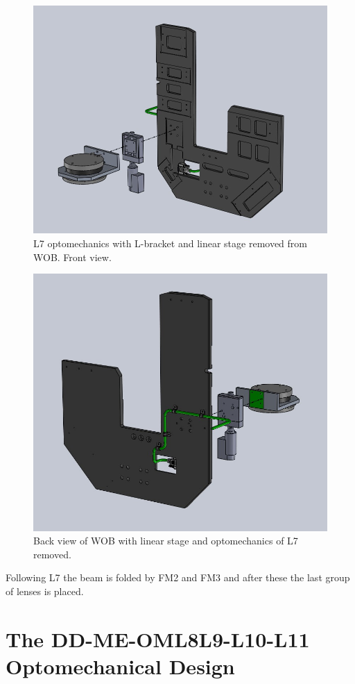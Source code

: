 \documentclass{report}
\begin{document}
\begin{figure}
\begin{center}
\includegraphics[width=0.7\linewidth]{figures/WOB-L7 Front.jpg}
\end{center}
\caption{L7 optomechanics with L-bracket and linear stage removed from WOB. Front view.}
\label{figure:WOB-L7-F}
\end{figure}

\begin{figure}
\begin{center}
\includegraphics[width=0.7\linewidth]{figures/WOB-L7 Back.jpg}
\end{center}
\caption{Back view of WOB with linear stage and optomechanics of L7 removed.}
\label{figure:WOB-L7-B}
\end{figure}

Following L7 the beam is folded by FM2 and FM3 and after these the last group of lenses is placed.



\section{The DD-ME-OML8L9-L10-L11 Optomechanical Design}
\end{document}
